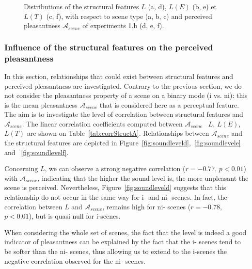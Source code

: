 \documentclass[twoside,twocolumn]{article}
\begin{document}
\begin{figure}[t]
       \caption{Distributions of the structural features $L$ (a, d), $L(E)$ (b, e) et $L(T)$ (c, f), with respect to scene type (a, b, c) and perceived pleasantness $\mathcal{A}_{scene}$ of experiments 1.b (d, e, f).}
\end{figure}

\subsubsection*{Influence of the structural features on the perceived pleasantness}

In this section, relationships that could exist between structural features and perceived pleasantness are investigated. Contrary to the previous section, we do not consider the pleasantness property of a scene on a binary mode (i vs. ni): this is the mean pleasantness $\mathcal{A}_{scene}$ that is considered here as a perceptual feature. The aim is to investigate the level of correlation between structural features and $\mathcal{A}_{scene}$. The linear correlation coefficients computed between $\mathcal{A}_{scene}$ \vs~$L$, $L(E)$, $L(T)$ are shown on Table~\ref{tab:corrStructA}. Relationships between $\mathcal{A}_{scene}$ and the structural features are depicted in Figure~\ref{fig:soundleveld},~\ref{fig:soundlevele} and ~\ref{fig:soundlevelf}.

Concerning $L$, we can observe a strong negative correlation ($r=-0.77$, $p<0.01$) with $\mathcal{A}_{scene}$, indicating that the higher the sound level is, the more unpleasant the scene is perceived. Nevertheless, Figure~\ref{fig:soundleveld} suggests that this relationship do not occur in the same way for i- and ni- scenes. In fact, the correlation between $L$ and $\mathcal{A}_{scene}$, remains high for ni- scenes ($r=-0.78$, $p<0.01$), but is quasi null for i-scenes.

When considering the whole set of scenes, the fact that the level is indeed a good indicator of pleasantness can be explained by the fact that the i- scenes tend to be softer than the ni- scenes, thus allowing us to extend to the i-scenes the negative correlation observed for the ni- scenes.
\end{document}
